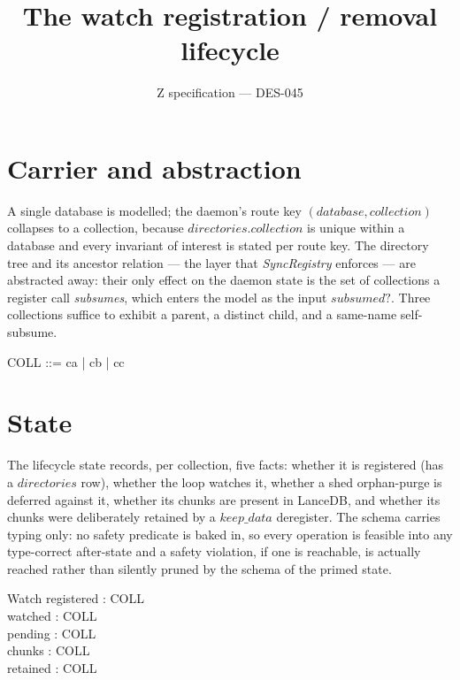 \documentclass[a4paper]{article}
\begin{document}
\title{The watch registration / removal lifecycle}
\author{Z specification --- DES-045}
\date{}
\maketitle

\section{Carrier and abstraction}

A single database is modelled; the daemon's route key $(database, collection)$
collapses to a collection, because $directories.collection$ is unique within a
database and every invariant of interest is stated per route key.  The
directory tree and its ancestor relation --- the layer that
\textit{SyncRegistry} enforces --- are abstracted away: their only effect on the
daemon state is the set of collections a register call \textit{subsumes}, which
enters the model as the input $subsumed?$.  Three collections suffice to exhibit
a parent, a distinct child, and a same-name self-subsume.

\begin{zed}
  COLL ::= ca | cb | cc
\end{zed}

\section{State}

The lifecycle state records, per collection, five facts: whether it is
registered (has a $directories$ row), whether the loop watches it, whether a
shed orphan-purge is deferred against it, whether its chunks are present in
LanceDB, and whether its chunks were deliberately retained by a
$keep\_data$ deregister.  The schema carries typing only: no safety predicate
is baked in, so every operation is feasible into any type-correct after-state
and a safety violation, if one is reachable, is actually reached rather than
silently pruned by the schema of the primed state.

\begin{schema}{Watch}
  registered : \power COLL \\
  watched : \power COLL \\
  pending : \power COLL \\
  chunks : \power COLL \\
  retained : \power COLL
\end{schema}
\end{document}
